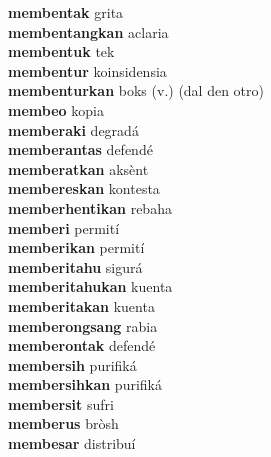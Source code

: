 \textbf{membentak } grita \\
\textbf{membentangkan } aclaria \\
\textbf{membentuk } tek \\
\textbf{membentur } koinsidensia \\
\textbf{membenturkan } boks (v.) (dal den otro) \\
\textbf{membeo } kopia \\
\textbf{memberaki } degradá \\
\textbf{memberantas } defendé \\
\textbf{memberatkan } aksènt \\
\textbf{membereskan } kontesta \\
\textbf{memberhentikan } rebaha \\
\textbf{memberi } permití \\
\textbf{memberikan } permití \\
\textbf{memberitahu } sigurá \\
\textbf{memberitahukan } kuenta \\
\textbf{memberitakan } kuenta \\
\textbf{memberongsang } rabia \\
\textbf{memberontak } defendé \\
\textbf{membersih } purifiká \\
\textbf{membersihkan } purifiká \\
\textbf{membersit } sufri \\
\textbf{memberus } bròsh \\
\textbf{membesar } distribuí \\
